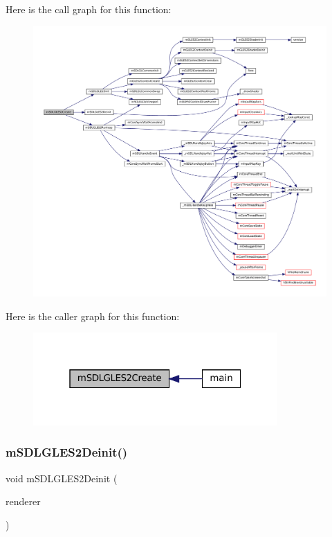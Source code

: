 Here is the call graph for this function\+:
\nopagebreak
\begin{figure}[H]
\begin{center}
\leavevmode
\includegraphics[width=350pt]{gles2-sdl_8c_a1940d2984f689899b148f24b7ab39e48_cgraph}
\end{center}
\end{figure}
Here is the caller graph for this function\+:
\nopagebreak
\begin{figure}[H]
\begin{center}
\leavevmode
\includegraphics[width=265pt]{gles2-sdl_8c_a1940d2984f689899b148f24b7ab39e48_icgraph}
\end{center}
\end{figure}
\mbox{\label{gles2-sdl_8c_a2d06ef5baf7a055c8ff28c80eb81b55c}} 
\subsubsection{\texorpdfstring{m\+S\+D\+L\+G\+L\+E\+S2\+Deinit()}{mSDLGLES2Deinit()}}
{\footnotesize\ttfamily void m\+S\+D\+L\+G\+L\+E\+S2\+Deinit (\begin{DoxyParamCaption}\item[{struct \mbox{\hyperlink{structm_s_d_l_renderer}{m\+S\+D\+L\+Renderer}} $\ast$}]{renderer }\end{DoxyParamCaption})\hspace{0.3cm}{\ttfamily [static]}}

